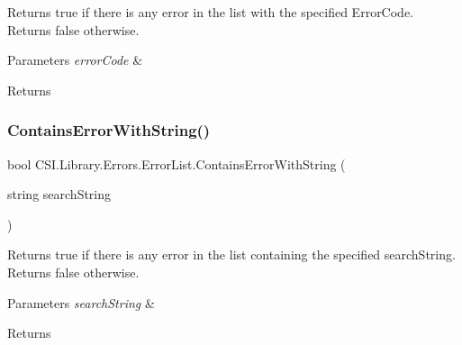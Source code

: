 Returns true if there is any error in the list with the specified Error\+Code. Returns false otherwise. 


\begin{DoxyParams}{Parameters}
{\em error\+Code} & \\
\hline
\end{DoxyParams}
\begin{DoxyReturn}{Returns}

\end{DoxyReturn}
\mbox{\label{class_c_s_i_1_1_library_1_1_errors_1_1_error_list_a190aec44cae9f7829328793047dd9756}} 
\subsubsection{\texorpdfstring{ContainsErrorWithString()}{ContainsErrorWithString()}}
{\footnotesize\ttfamily bool C\+S\+I.\+Library.\+Errors.\+Error\+List.\+Contains\+Error\+With\+String (\begin{DoxyParamCaption}\item[{string}]{search\+String }\end{DoxyParamCaption})\hspace{0.3cm}{\ttfamily [inline]}}



Returns true if there is any error in the list containing the specified search\+String. Returns false otherwise. 


\begin{DoxyParams}{Parameters}
{\em search\+String} & \\
\hline
\end{DoxyParams}
\begin{DoxyReturn}{Returns}

\end{DoxyReturn}
\mbox{\label{class_c_s_i_1_1_library_1_1_errors_1_1_error_list_a449558309268927f61ab310af7757d33}} 
